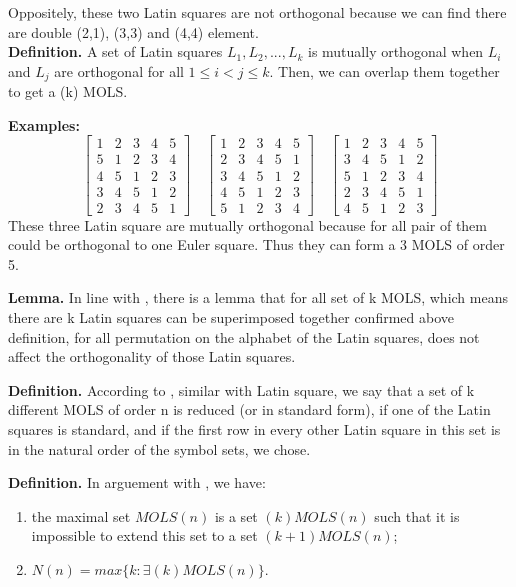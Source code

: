 \documentclass[12pt]{article}
\begin{document}
Oppositely, these two Latin squares are not orthogonal because we can find there are double (2,1), (3,3) and (4,4) element.\\


\textbf{Definition.} A set of Latin squares $L_1, L_2, . . . , L_k$ is mutually orthogonal when $L_i$ and $L_j$ are orthogonal for all $1 \le i < j \le k$. Then, we can overlap them together to get a  (k) MOLS.

\textbf{Examples:}
\[ \begin{bmatrix} 1 & 2 & 3 & 4 & 5\\5 & 1 & 2 & 3 & 4\\4 & 5 & 1 & 2 & 3\\
                   3 & 4 & 5 & 1 & 2\\2 & 3 & 4 & 5 & 1 \end{bmatrix} \quad
   \begin{bmatrix} 1 & 2 & 3 & 4 & 5\\2 & 3 & 4 & 5 & 1\\3 & 4 & 5 & 1 & 2\\
                   4 & 5 & 1 & 2 & 3\\5 & 1 & 2 & 3 & 4 \end{bmatrix} \quad
   \begin{bmatrix} 1 & 2 & 3 & 4 & 5\\3 & 4 & 5 & 1 & 2\\5 & 1 & 2 & 3 & 4\\
                   2 & 3 & 4 & 5 & 1\\4 & 5 & 1 & 2 & 3 \end{bmatrix} \]
These three Latin square are mutually orthogonal because for all pair of them could be orthogonal to one Euler square. Thus they can form a 3 MOLS of order 5.

\textbf{Lemma.} In line with \cite{ref1}, there is a lemma that for all set of k MOLS, which means there are k Latin squares can be superimposed together confirmed above definition, for all permutation on the alphabet of the Latin squares, does not affect the orthogonality of those Latin squares.

\textbf{Definition.} According to \cite{ref11}, similar with Latin square, we say that a set of k different MOLS of order n is reduced (or in standard form), if one of the Latin squares is standard, and if the first row in every other Latin square in this set is in the natural order of the symbol sets, we chose.

\textbf{Definition.} In arguement with \cite{ref12}, we have:
\begin{enumerate}[1.]
\item the maximal set $MOLS(n)$ is a set $(k)MOLS(n)$ such that it is impossible to extend this set to a set $(k + 1)MOLS(n)$;
\item $N(n) = max\{k : \exists (k)MOLS(n)\}$.
\end{enumerate}
\end{document}
